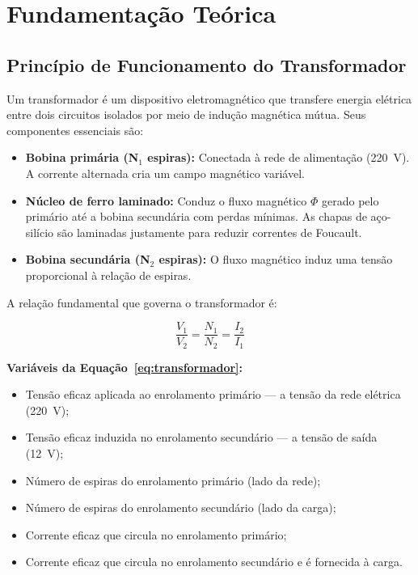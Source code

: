 \documentclass[12pt, a4paper]{article}
\begin{document}
\section{Fundamentação Teórica}

\subsection{Princípio de Funcionamento do Transformador}

Um transformador é um dispositivo eletromagnético que transfere energia elétrica entre dois circuitos isolados por meio de indução magnética mútua. Seus componentes essenciais são:

\begin{itemize}[leftmargin=2cm]
    \item \textbf{Bobina primária (N$_1$ espiras):} Conectada à rede de alimentação (220~V). A corrente alternada cria um campo magnético variável.
    \item \textbf{Núcleo de ferro laminado:} Conduz o fluxo magnético $\Phi$ gerado pelo primário até a bobina secundária com perdas mínimas. As chapas de aço-silício são laminadas justamente para reduzir correntes de Foucault.
    \item \textbf{Bobina secundária (N$_2$ espiras):} O fluxo magnético induz uma tensão proporcional à relação de espiras.
\end{itemize}

A relação fundamental que governa o transformador é:

\begin{equation}
    \frac{V_1}{V_2} = \frac{N_1}{N_2} = \frac{I_2}{I_1}
    \label{eq:transformador}
\end{equation}

\noindent\textbf{Variáveis da Equação~\ref{eq:transformador}:}
\begin{itemize}[leftmargin=3cm, itemsep=2pt, topsep=4pt]
    \item[$V_1$ (V)] Tensão eficaz aplicada ao enrolamento primário --- a tensão da rede elétrica (220~V);
    \item[$V_2$ (V)] Tensão eficaz induzida no enrolamento secundário --- a tensão de saída (12~V);
    \item[$N_1$]     Número de espiras do enrolamento primário (lado da rede);
    \item[$N_2$]     Número de espiras do enrolamento secundário (lado da carga);
    \item[$I_1$ (A)] Corrente eficaz que circula no enrolamento primário;
    \item[$I_2$ (A)] Corrente eficaz que circula no enrolamento secundário e é fornecida à carga.
\end{itemize}
\end{document}
